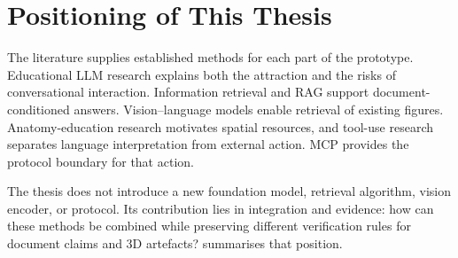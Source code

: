\section{Positioning of This Thesis}
\label{sec:positioning-thesis}

The literature supplies established methods for each part of the prototype. Educational LLM research explains both the attraction and the risks of conversational interaction. Information retrieval and RAG support document-conditioned answers. Vision--language models enable retrieval of existing figures. Anatomy-education research motivates spatial resources, and tool-use research separates language interpretation from external action. MCP provides the protocol boundary for that action.

The thesis does not introduce a new foundation model, retrieval algorithm, vision encoder, or protocol. Its contribution lies in integration and evidence: how can these methods be combined while preserving different verification rules for document claims and 3D artefacts?  summarises that position.

